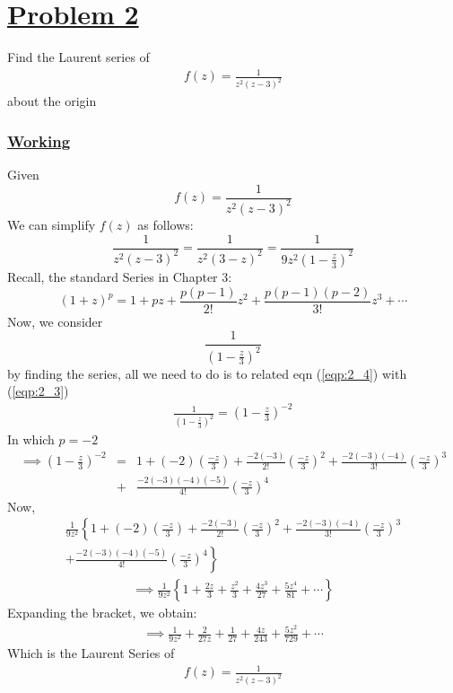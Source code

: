 \documentclass[12pt]{report}
\newcommand{\ubt}[1]{\textbf{\underline{#1}}}
\newcommand{\sps}{\\[0.2cm]}
\newcommand{\refn}[1]{(\ref{#1})}
\newcommand{\refxq}[1]{\refn{eqp:#1}}
\newcommand{\problem}[1]{\section*{\ubt{Problem #1}}}
\newcommand{\working}{\subsubsection{\ubt{Working}}}
\begin{document}
	
	\problem{2}
	Find the Laurent series of
	\begin{eqnarray*}
		f(z) = \frac{1}{z^2(z-3)^2}
	\end{eqnarray*}
	about the origin
	\working
	Given
	\begin{equation}
		f(z) = \frac{1}{z^2(z-3)^2} \tag{1}\label{eqp:2_1}
	\end{equation}
	We can simplify $f(z)$ as follows:
	\begin{equation}
		\frac{1}{z^2(z-3)^2} = \frac{1}{z^2(3-z)^2} = \frac{1}{9z^2\left(1-\frac{z}{3}\right)^2} \tag{2}\label{eqp:2_2}
	\end{equation}
	Recall, the standard Series in Chapter 3:
	\begin{equation}
			(1+z)^p = 1+ pz + \frac{p(p-1)}{2!}z^2 + \frac{p(p-1)(p-2)}{3!}z^3 + \cdots \tag{3}\label{eqp:2_3}
	\end{equation}
	Now, we consider 
	\begin{equation}
		\frac{1}{\left(1-\frac{z}{3}\right)^2} \tag{4}\label{eqp:2_4}
	\end{equation}
	by finding the series, all we need to do is to related eqn \refxq{2_4} with \refxq{2_3}
	\begin{eqnarray*}
		\frac{1}{\left(1-\frac{z}{3}\right)^2} = \left(1-\frac{z}{3}\right)^{-2}
	\end{eqnarray*} 
	In which $p=-2$
	\begin{eqnarray*}
		\implies \left(1-\frac{z}{3}\right)^{-2} &=& 1 + (-2) \left(\frac{-z}{3}\right) + \frac{-2(-3)}{2!}\left(\frac{-z}{3}\right)^2 + \frac{-2(-3)(-4)}{3!}\left(\frac{-z}{3}\right)^3\sps
		&+& \frac{-2(-3)(-4)(-5)}{4!}\left(\frac{-z}{3}\right)^4
	\end{eqnarray*}
	Now,
	\begin{gather*}
		\frac{1}{9z^2}\left\{ 1+ (-2)\left(\frac{-z}{3}\right) + \frac{-2(-3)}{2!}\left(\frac{-z}{3}\right)^2 + \frac{-2(-3)(-4)}{3!}\left(\frac{-z}{3}\right)^3 \right.\sps
		+ \left. \frac{-2(-3)(-4)(-5)}{4!}\left(\frac{-z}{3}\right)^4 \right\}
	\end{gather*}
	\begin{eqnarray*}
		\implies \frac{1}{9z^2}\left\{ 1 + \frac{2z}{3} + \frac{z^2}{3}+ \frac{4z^3}{27}+ \frac{5z^4}{81}+\cdots \right\}
	\end{eqnarray*}
	Expanding the bracket, we obtain:
	\begin{eqnarray*}
		\implies \frac{1}{9z^2} + \frac{2}{27z} + \frac{1}{27} + \frac{4z}{243} + \frac{5z^2}{729} + \cdots
	\end{eqnarray*}
	Which is the Laurent Series of
	\begin{eqnarray*}
		f(z) = \frac{1}{z^2(z-3)^2}
	\end{eqnarray*}
	
\end{document}
